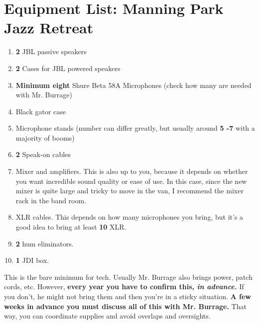 \documentclass[11pt,a4paper]{book}
\begin{document}
\section{Equipment List: Manning Park Jazz Retreat}
\begin{enumerate}
\item \textbf{2} JBL passive speakers
\item \textbf{2} Cases for JBL powered speakers
\item \textbf{Minimum eight} Shure Beta 58A Microphones (check how many are needed with Mr. Burrage)
\item Black gator case
\item Microphone stands (number can differ greatly, but usually around \textbf{5 -7} with a majority of booms)
\item \textbf{2} Speak-on cables
\item Mixer and amplifiers. This is also up to you, because it depends on whether you want incredible sound quality or ease of use. In this case, since the new mixer is quite large and tricky to move in the van, I recommend the mixer rack in the band room.
\item XLR cables. This depends on how many microphones you bring, but it's a good idea to bring at least \textbf{10} XLR.
\item \textbf{2} hum eliminators.
\item \textbf{1} JDI box.
\end{enumerate}
This is the bare minimum for tech. Usually Mr. Burrage also brings power, patch cords, etc. However, \textbf{every year you have to confirm this, \textit{in advance.}} If you don't, he might not bring them and then you're in a sticky situation. \textbf{A few weeks in advance you must discuss all of this with Mr. Burrage.} That way, you can coordinate supplies and avoid overlaps and oversights.
\end{document}
